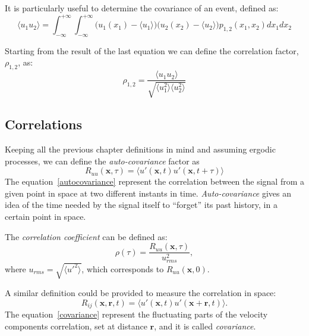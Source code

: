 It is particularly useful to determine the covariance of an event, defined as:
\begin{equation*}
\langle u_{1}u_{2} \rangle = \int_{-\infty}^{+\infty} \int_{-\infty}^{+\infty} \big( u_{1}(x_{1}) - \langle u_{1} \rangle \big) \big( u_{2}(x_{2}) - \langle u_{2} \rangle \big) p_{1,2}(x_{1},x_{2}) dx_{1} dx_{2}
\end{equation*}
\par
Starting from the result of the last equation we can define the correlation factor, $\rho_{1,2}$, as:
\begin{equation*}
\rho_{1,2} = \frac{\langle u_{1} u_{2} \rangle}{\sqrt{\langle u_{1}^{2} \rangle \langle u_{2}^{2} \rangle}}
\end{equation*}



\subsection{Correlations}

Keeping all the previous chapter definitions in mind and assuming ergodic processes, we can define the \emph{auto-covariance} factor as 
\begin{equation}
R_{uu}(\mathbf{x},\tau) = \langle u'(\mathbf{x},t) u'(\mathbf{x},t+\tau) \rangle
\label{autocovariance}
\end{equation}
The equation~\ref{autocovariance} represent the correlation between the signal from a given point in space at two different instants in time. \emph{Auto-covariance} gives an idea of the time needed by the signal itself to ``forget'' its past history, in a certain point in space. \par
The \emph{correlation coefficient} can be defined as:
\begin{equation*}
\rho(\tau) = \frac{R_{uu}(\mathbf{x},\tau)}{u_{rms}^{2}},
\end{equation*}
where $u_{rms}= \sqrt{\langle u'^{2} \rangle}$, which corresponds to $R_{uu}(\mathbf{x},0)$.\par

A similar definition could be provided to measure the correlation in space:
\begin{equation}
R_{ij}(\mathbf{x},\mathbf{r},t) = \langle u'(\mathbf{x},t) u'(\mathbf{x}+\mathbf{r},t) \rangle.
\label{covariance}
\end{equation}
The equation~\ref{covariance} represent the fluctuating parts of the velocity components correlation, set at distance $\mathbf{r}$, and it is called \emph{covariance}.\par
 



